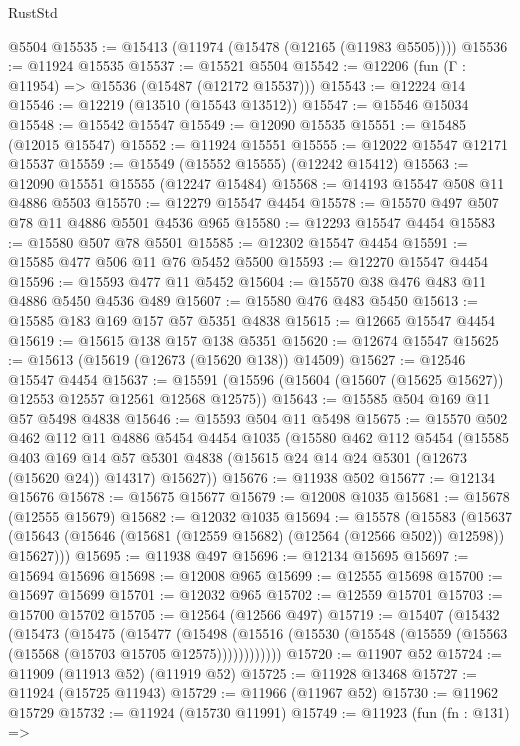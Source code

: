 \begin{lexlean}{RustStd}
\begin{coremodule}
{\begin{coremodule}
{{{{{{{{{{{{{{{{{{{{{{{{{{{{{{{{{{{{{{{{{{{{{{{{{{{{{{{{{{{{{{{{{{{{{{{{{{{{{{{{    @5504
@15535 := @15413 (@11974 (@15478 (@12165 (@11983 @5505))))
@15536 := @11924 @15535
@15537 := @15521 @5504
@15542 := @12206 (fun (Γ : @11954) => @15536 (@15487 (@12172 @15537)))
@15543 := @12224 @14
@15546 := @12219 (@13510 (@15543 @13512))
@15547 := @15546 @15034
@15548 := @15542 @15547
@15549 := @12090 @15535
@15551 := @15485 (@12015 @15547)
@15552 := @11924 @15551
@15555 := @12022 @15547 @12171 @15537
@15559 := @15549 (@15552 @15555) (@12242 @15412)
@15563 := @12090 @15551 @15555 (@12247 @15484)
@15568 := @14193 @15547 @508 @11 @4886 @5503
@15570 := @12279 @15547 @4454
@15578 := @15570 @497 @507 @78 @11 @4886 @5501 @4536 @965
@15580 := @12293 @15547 @4454
@15583 := @15580 @507 @78 @5501
@15585 := @12302 @15547 @4454
@15591 := @15585 @477 @506 @11 @76 @5452 @5500
@15593 := @12270 @15547 @4454
@15596 := @15593 @477 @11 @5452
@15604 := @15570 @38 @476 @483 @11 @4886 @5450 @4536 @489
@15607 := @15580 @476 @483 @5450
@15613 := @15585 @183 @169 @157 @57 @5351 @4838
@15615 := @12665 @15547 @4454
@15619 := @15615 @138 @157 @138 @5351
@15620 := @12674 @15547
@15625 := @15613 (@15619 (@12673 (@15620 @138)) @14509)
@15627 := @12546 @15547 @4454
@15637 := @15591 (@15596 (@15604 (@15607 (@15625 @15627)) @12553 @12557 @12561 @12568 @12575))
@15643 := @15585 @504 @169 @11 @57 @5498 @4838
@15646 := @15593 @504 @11 @5498
@15675 := @15570
    @502
    @462
    @112
    @11
    @4886
    @5454
    @4454
    @1035
    (@15580
      @462
      @112
      @5454
      (@15585
        @403
        @169
        @14
        @57
        @5301
        @4838
        (@15615 @24 @14 @24 @5301 (@12673 (@15620 @24)) @14317)
        @15627))
@15676 := @11938 @502
@15677 := @12134 @15676
@15678 := @15675 @15677
@15679 := @12008 @1035
@15681 := @15678 (@12555 @15679)
@15682 := @12032 @1035
@15694 := @15578
    (@15583
      (@15637 (@15643 (@15646 (@15681 (@12559 @15682) (@12564 (@12566 @502)) @12598)) @15627)))
@15695 := @11938 @497
@15696 := @12134 @15695
@15697 := @15694 @15696
@15698 := @12008 @965
@15699 := @12555 @15698
@15700 := @15697 @15699
@15701 := @12032 @965
@15702 := @12559 @15701
@15703 := @15700 @15702
@15705 := @12564 (@12566 @497)
@15719 := @15407
    (@15432
      (@15473
        (@15475
          (@15477
            (@15498
              (@15516 (@15530 (@15548 (@15559 (@15563 (@15568 (@15703 @15705 @12575))))))))))))
@15720 := @11907 @52
@15724 := @11909 (@11913 @52) (@11919 @52)
@15725 := @11928 @13468
@15727 := @11924 (@15725 @11943)
@15729 := @11966 (@11967 @52)
@15730 := @11962 @15729
@15732 := @11924 (@15730 @11991)
@15749 := @11923
    (fun (fn : @131) =>
}}}}}}}}}}}}}}}}}}}}}}}}}}}}}}}}}}}}}}}}}}}}}}}}}}}}}}}}}}}}}}}}}}}}}}}}}}}}}}}}
\end{coremodule}}
\end{coremodule}
\end{lexlean}
